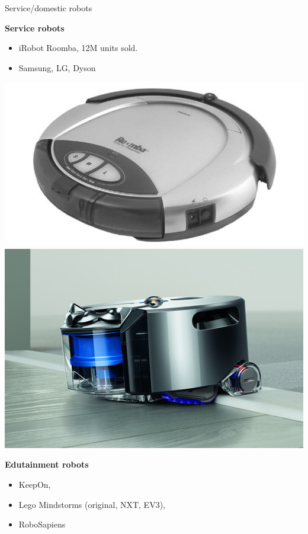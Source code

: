 \documentclass[compress]{beamer}
\begin{document}
\begin{frame}{Service/domestic robots}


    \begin{multicols}{2}

        \textbf{Service robots}

        \begin{itemize}
            \item
                iRobot Roomba, 12M units sold.
            \item
                Samsung, LG, Dyson
        \end{itemize}
        \vfill
        \columnbreak

        \begin{center}
            \includegraphics[width=0.5\linewidth]{roomba}
            \includegraphics[width=0.5\linewidth]{dyson}
        \end{center}
    \end{multicols}

    \pause

    \begin{multicols}{2}


        \textbf{Edutainment robots}

        \begin{itemize}
            \item \eg KeepOn, 
            \item Lego Mindstorms (original, NXT, EV3),
            \item RoboSapiens
        \end{itemize}
        \vfill
        \columnbreak
        \begin{center}


\end{center}
\end{multicols}
\end{frame}
\end{document}
